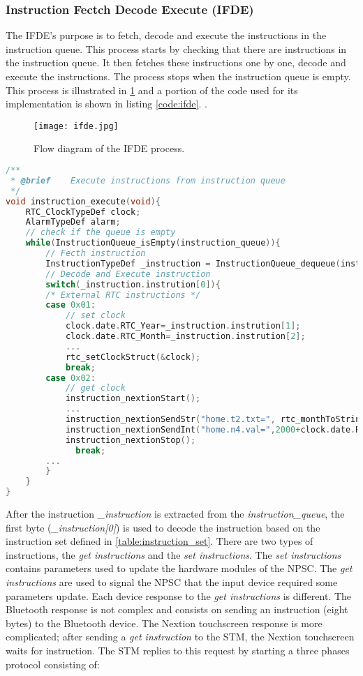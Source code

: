 \subsubsection{Instruction Fectch Decode Execute (IFDE)}
The IFDE's purpose is to fetch, decode and execute the instructions in the instruction queue. This process starts by checking that there are instructions in the instruction queue. It then fetches these instructions one by one, decode and execute the instructions. The process stops when the instruction queue is empty. This process is illustrated in \cref{fig:ifde} and a portion of the code used for its implementation is shown in listing \ref{code:ifde}. .
\begin{figure}[ht]
\centering
\texttt{[image: ifde.jpg]}
\caption{Flow diagram of the IFDE process.}
\label{fig:ifde}
\end{figure}
\begin{lstlisting}[language=C, caption=Instruction Fetch Decode Execute, label=code:ifde]
/**
 * @brief    Execute instructions from instruction queue
 */
void instruction_execute(void){
    RTC_ClockTypeDef clock;
    AlarmTypeDef alarm;
    // check if the queue is empty
    while(InstructionQueue_isEmpty(instruction_queue)){
        // Fecth instruction
        InstructionTypeDef _instruction = InstructionQueue_dequeue(instruction_queue);
        // Decode and Execute instruction
        switch(_instruction.instrution[0]){
        /* External RTC instructions */
        case 0x01:
            // set clock
            clock.date.RTC_Year=_instruction.instrution[1];
            clock.date.RTC_Month=_instruction.instrution[2];
            ...
            rtc_setClockStruct(&clock);
            break;
        case 0x02:
            // get clock
            instruction_nextionStart();
            ...            
            instruction_nextionSendStr("home.t2.txt=", rtc_monthToString(clock.date.RTC_Month) );
            instruction_nextionSendInt("home.n4.val=",2000+clock.date.RTC_Year);
            instruction_nextionStop();
              break;        
        ...
        }
    }
}
\end{lstlisting}
After the instruction \textit{\_instruction} is extracted from the \textit{instruction\_queue}, the first byte (\textit{\_instruction[0]}) is used to decode the instruction based on the instruction set defined in \cref{table:instruction_set}. There are two types of instructions, the \textit{get instructions} and the \textit{set instructions}. The \textit{set instructions} contains parameters used to update the hardware modules of the NPSC. The \textit{get instructions} are used to signal the NPSC that the input device required some parameters update. Each device response to the \textit{get instructions} is different. The Bluetooth response is not complex and consists on sending an instruction (eight bytes) to the Bluetooth device. The Nextion touchscreen response is more complicated; after sending a \textit{get instruction} to the STM, the Nextion touchscreen waits for instruction. The STM replies to this request by starting a three phases protocol consisting of:
